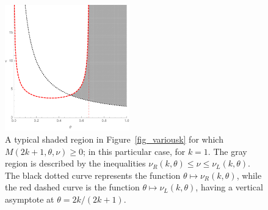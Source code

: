 \documentclass[a4paper]{article}
\newcommand{\te}{\theta}
\newcommand{\nul}{\nu_L(k,\theta)}
\newcommand{\nur}{\nu_R(k,\theta)}
\begin{document}
\begin{figure}
\begin{center}
\includegraphics[width=0.48\textwidth]{fig_boundary.pdf}
\caption{A typical shaded region in Figure~\ref{fig_variousk} for which $M(2k+1,\te,\nu)\ge 0$; in this particular case, for $k=1$. The gray region is described by the inequalities $\nur\le\nu\le\nul$. The black dotted curve represents the function $\te\mapsto\nur$, while the red dashed curve is the function
$\te\mapsto\nul$, having a vertical asymptote at $\te=2k/(2k+1)$.}\label{fig_boundary}
\end{center}
\end{figure}
\end{document}
